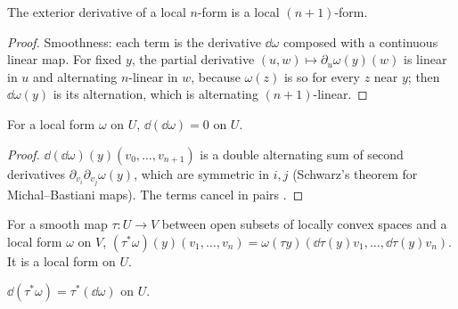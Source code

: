 \begin{proposition}
  \label{prop:local-d-form}
  \leanok
  The exterior derivative of a local $n$-form is a local $(n+1)$-form.
\end{proposition}

\begin{proof}
  \leanok
  Smoothness: each term is the derivative $\dd\omega$ composed with a continuous linear map.
  For fixed $y$, the partial derivative $(u, w) \mapsto \partial_u \omega(y)(w)$ is linear in $u$
  and alternating $n$-linear in $w$, because $\omega(z)$ is so for every $z$ near $y$; then
  $\dd\omega(y)$ is its alternation, which is alternating $(n+1)$-linear.
\end{proof}

\begin{theorem}[$\dd \circ \dd = 0$, locally]
  \label{thm:local-dd}
  \leanok
  For a local form $\omega$ on $U$, $\dd(\dd\omega) = 0$ on $U$.
\end{theorem}

\begin{proof}
  \leanok
  $\dd(\dd\omega)(y)(v_0, \dots, v_{n+1})$ is a double alternating sum of second derivatives
  $\partial_{v_i}\partial_{v_j}\omega(y)$, which are symmetric in $i, j$ (Schwarz's theorem for
  Michal--Bastiani maps). The terms cancel in pairs \cite[Remark~3.6.10]{GN26}.
\end{proof}

\begin{definition}
  \label{def:local-pullback}
  \leanok
  For a smooth map $\tau \colon U \to V$ between open subsets of locally convex spaces and a
  local form $\omega$ on $V$,
  $(\tau^*\omega)(y)(v_1, \dots, v_n) = \omega(\tau y)(\dd\tau(y) v_1, \dots, \dd\tau(y) v_n)$.
  It is a local form on $U$.
\end{definition}

\begin{theorem}
  \label{thm:local-naturality}
  \leanok
  $\dd(\tau^*\omega) = \tau^*(\dd\omega)$ on $U$.
\end{theorem}

